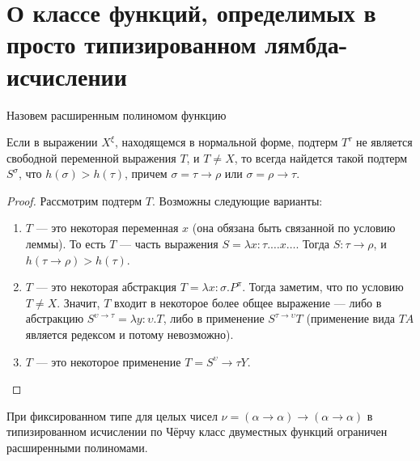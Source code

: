 \section{О классе функций, определимых в просто типизированном лямбда-исчислении}

\begin{definition}
Назовем расширенным полиномом функцию 
\end{definition}

\begin{lemma}
Если в выражении $X^\xi$, находящемся в нормальной форме,
подтерм $T^\tau$ не является свободной переменной выражения
$T$, и $T \ne X$, то всегда найдется такой подтерм $S^\sigma$, что 
$h(\sigma) > h(\tau)$, причем $\sigma=\tau\rightarrow\rho$ или
$\sigma=\rho\rightarrow\tau$.
\end{lemma}

\begin{proof}
Рассмотрим подтерм $T$. Возможны следующие варианты:

\begin{enumerate}
\item $T$ --- это некоторая переменная $x$ (она обязана быть связанной по условию леммы).
То есть $T$ --- часть выражения $S = \lambda x:\tau. \dots x \dots$. 
Тогда $S: \tau\rightarrow\rho$, и $h(\tau\rightarrow\rho) > h(\tau)$.
\item $T$ --- это некоторая абстракция $T=\lambda x:\sigma.P^\pi$. 
Тогда заметим, что по условию $T \ne X$. Значит, $T$ входит в некоторое более
общее выражение --- либо в абстракцию
$S^{\upsilon\rightarrow\tau} = \lambda y:\upsilon.T$, либо
в применение $S^{\tau\rightarrow\upsilon} T$
(применение вида $T A$ является редексом и потому невозможно).
\item $T$ --- это некоторое применение $T=S^\upsilon\rightarrow\tau Y$.
\end{enumerate}

\end{proof}

\begin{theorem}
При фиксированном типе для целых чисел 
$\nu=(\alpha\rightarrow\alpha)\rightarrow(\alpha\rightarrow\alpha)$
в типизированном исчислении по Чёрчу класс двуместных функций ограничен 
расширенными полиномами.
\end{theorem}

